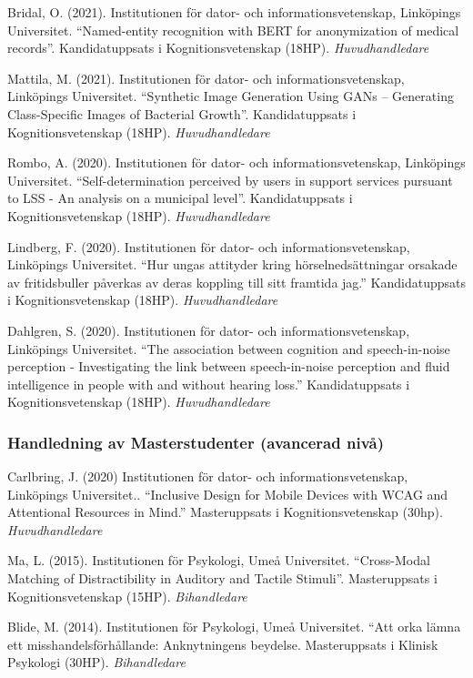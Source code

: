 \documentclass[]{article}
\begin{document}
Bridal, O. (2021). Institutionen för dator- och informationsvetenskap,
Linköpings Universitet. ``Named-entity recognition with BERT for
anonymization of medical records''. Kandidatuppsats i
Kognitionsvetenskap (18HP). \emph{Huvudhandledare}

Mattila, M. (2021). Institutionen för dator- och informationsvetenskap,
Linköpings Universitet. ``Synthetic Image Generation Using GANs --
Generating Class-Specific Images of Bacterial Growth''. Kandidatuppsats
i Kognitionsvetenskap (18HP). \emph{Huvudhandledare}

Rombo, A. (2020). Institutionen för dator- och informationsvetenskap,
Linköpings Universitet. ``Self-determination perceived by users in
support services pursuant to LSS - An analysis on a municipal level''.
Kandidatuppsats i Kognitionsvetenskap (18HP). \emph{Huvudhandledare}

Lindberg, F. (2020). Institutionen för dator- och informationsvetenskap,
Linköpings Universitet. ``Hur ungas attityder kring hörselnedsättningar
orsakade av fritidsbuller påverkas av deras koppling till sitt framtida
jag.'' Kandidatuppsats i Kognitionsvetenskap (18HP).
\emph{Huvudhandledare}

Dahlgren, S. (2020). Institutionen för dator- och informationsvetenskap,
Linköpings Universitet. ``The association between cognition and
speech-in-noise perception - Investigating the link between
speech-in-noise perception and fluid intelligence in people with and
without hearing loss.'' Kandidatuppsats i Kognitionsvetenskap (18HP).
\emph{Huvudhandledare}

\hypertarget{handledning-av-masterstudenter-avancerad-nivuxe5}{%
\subsubsection{Handledning av Masterstudenter (avancerad
nivå)}\label{handledning-av-masterstudenter-avancerad-nivuxe5}}

Carlbring, J. (2020) Institutionen för dator- och informationsvetenskap,
Linköpings Universitet.. ``Inclusive Design for Mobile Devices with WCAG
and Attentional Resources in Mind.'' Masteruppsats i Kognitionsvetenskap
(30hp). \emph{Huvudhandledare}

Ma, L. (2015). Institutionen för Psykologi, Umeå Universitet.
``Cross-Modal Matching of Distractibility in Auditory and Tactile
Stimuli''. Masteruppsats i Kognitionsvetenskap (15HP).
\emph{Bihandledare}

Blide, M. (2014). Institutionen för Psykologi, Umeå Universitet. ``Att
orka lämna ett misshandelsförhållande: Anknytningens beydelse.
Masteruppsats i Klinisk Psykologi (30HP). \emph{Bihandledare}
\end{document}
